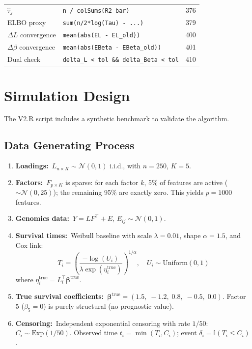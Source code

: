\documentclass[11pt]{article}
\newcommand{\coderef}[1]{{\color{blue!70!black}\texttt{#1}}}
\begin{document}
\begin{center}
\begin{longtable}{p{5cm}p{5cm}p{3cm}}
$\hat{\tau}_j$ & \coderef{n / colSums(R2\_bar)} & 376 \\
ELBO proxy & \coderef{sum(n/2*log(Tau) - ...)} & 379 \\
\midrule
$\Delta L$ convergence & \coderef{mean(abs(EL - EL\_old))} & 400 \\
$\Delta\beta$ convergence & \coderef{mean(abs(EBeta - EBeta\_old))} & 401 \\
Dual check & \coderef{delta\_L < tol \&\& delta\_Beta < tol} & 410 \\
\bottomrule
\end{longtable}
\end{center}

\section{Simulation Design}\label{sec:simulation}

The V2.R script includes a synthetic benchmark to validate the algorithm.

\subsection{Data Generating Process}

\begin{enumerate}[noitemsep]
\item \textbf{Loadings:}\ $L_{n\times K} \sim \mathcal{N}(0, 1)$ i.i.d.,
      with $n=250$, $K=5$.

\item \textbf{Factors:}\ $F_{p\times K}$ is sparse: for each factor $k$,
      5\% of features are active ($\sim \mathcal{N}(0, 25)$); the remaining
      95\% are exactly zero.  This yields $p=1000$ features.

\item \textbf{Genomics data:}\ $Y = LF^{\top} + E$, \quad
      $E_{ij} \sim \mathcal{N}(0, 1)$.

\item \textbf{Survival times:}\ Weibull baseline with scale $\lambda = 0.01$,
      shape $\alpha = 1.5$, and Cox link:
      \[
        T_i = \left(\frac{-\log(U_i)}{\lambda\exp(\eta_i^{\text{true}})}\right)^{1/\alpha},
        \quad U_i \sim \text{Uniform}(0,1)
      \]
      where $\eta_i^{\text{true}} = L_i^{\top}\bm{\beta}^{\text{true}}$.

\item \textbf{True survival coefficients:}\
      $\bm{\beta}^{\text{true}} = (1.5,\; -1.2,\; 0.8,\; -0.5,\; 0.0)$.
      Factor 5 ($\beta_5 = 0$) is purely structural (no prognostic value).

\item \textbf{Censoring:}\ Independent exponential censoring with rate
      $1/50$: $C_i \sim \text{Exp}(1/50)$.  Observed time
      $t_i = \min(T_i, C_i)$; event $\delta_i = \mathbb{I}(T_i \le C_i)$.
\end{enumerate}
\end{document}
